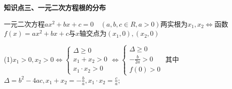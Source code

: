 \documentclass[11pt,a4paper]{ctexbook}
\begin{document}
\begin{formal}
    {\large \textbf{知识点三、一元二次方程根的分布}}
\end{formal}

一元二次方程$ax^2+bx+c=0\quad (a,b,c \in R,a>0)$两实根为$x_1,x_2 \Leftrightarrow$函数$f(x)=ax^2+bx+c$与$x$轴交点为$(x_1,0),(x_2,0)$

(1)\quad $\displaystyle x_{1}>0,x_2>0 \Leftrightarrow \left\{
\begin{aligned}
\Delta \ge 0 \\
x_1+x_2>0 \\
x_1 \cdot x_2 > 0
\end{aligned}
\right. 
\Leftrightarrow 
\left\{
\begin{aligned}
\Delta \ge 0 \\
-\frac{b}{2a}>0 \\
f(0) > 0
\end{aligned}
\right. 
$   其中$\displaystyle \Delta=b^2-4ac,x_1+x_2=-\frac{b}{a},x_1 \cdot x_2=\frac{c}{a}$;\par
\end{document}
